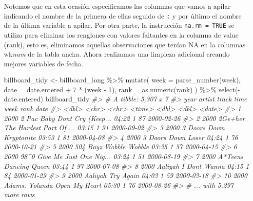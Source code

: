 \documentclass[
]{book}
\newenvironment{Shaded}{\begin{snugshade}}{\end{snugshade}}
\newcommand{\AttributeTok}[1]{\textcolor[rgb]{0.77,0.63,0.00}{#1}}
\newcommand{\CommentTok}[1]{\textcolor[rgb]{0.56,0.35,0.01}{\textit{#1}}}
\newcommand{\DecValTok}[1]{\textcolor[rgb]{0.00,0.00,0.81}{#1}}
\newcommand{\FunctionTok}[1]{\textcolor[rgb]{0.00,0.00,0.00}{#1}}
\newcommand{\NormalTok}[1]{#1}
\newcommand{\OtherTok}[1]{\textcolor[rgb]{0.56,0.35,0.01}{#1}}
\newcommand{\SpecialCharTok}[1]{\textcolor[rgb]{0.00,0.00,0.00}{#1}}
\begin{document}
Notemos que en esta ocasión especificamos las columnas que vamos a apilar
indicando el nombre de la primera de ellas seguido de \texttt{:} y por último el
nombre de la última variable a apilar. Por otra parte, la instrucción
\texttt{na.rm\ =\ TRUE} se utiliza para eliminar los renglones con valores faltantes en
la columna de value (rank), esto es, eliminamos aquellas observaciones que
tenían NA en la columnas wk\emph{num} de la tabla ancha. Ahora realizamos una
limpieza adicional creando mejores variables de fecha.

\begin{Shaded}
\begin{Highlighting}[]
\NormalTok{billboard\_tidy }\OtherTok{\textless{}{-}}\NormalTok{ billboard\_long }\SpecialCharTok{\%\textgreater{}\%}
  \FunctionTok{mutate}\NormalTok{(}
    \AttributeTok{week =} \FunctionTok{parse\_number}\NormalTok{(week),}
    \AttributeTok{date =}\NormalTok{ date.entered }\SpecialCharTok{+} \DecValTok{7} \SpecialCharTok{*}\NormalTok{ (week }\SpecialCharTok{{-}} \DecValTok{1}\NormalTok{), }
    \AttributeTok{rank =} \FunctionTok{as.numeric}\NormalTok{(rank)}
\NormalTok{    ) }\SpecialCharTok{\%\textgreater{}\%}
    \FunctionTok{select}\NormalTok{(}\SpecialCharTok{{-}}\NormalTok{date.entered)}
\NormalTok{billboard\_tidy}
\CommentTok{\#\textgreater{} \# A tibble: 5,307 x 7}
\CommentTok{\#\textgreater{}     year artist         track                   time    week  rank date      }
\CommentTok{\#\textgreater{}    \textless{}dbl\textgreater{} \textless{}chr\textgreater{}          \textless{}chr\textgreater{}                   \textless{}time\textgreater{} \textless{}dbl\textgreater{} \textless{}dbl\textgreater{} \textless{}date\textgreater{}    }
\CommentTok{\#\textgreater{}  1  2000 2 Pac          Baby Don\textquotesingle{}t Cry (Keep... 04:22      1    87 2000{-}02{-}26}
\CommentTok{\#\textgreater{}  2  2000 2Ge+her        The Hardest Part Of ... 03:15      1    91 2000{-}09{-}02}
\CommentTok{\#\textgreater{}  3  2000 3 Doors Down   Kryptonite              03:53      1    81 2000{-}04{-}08}
\CommentTok{\#\textgreater{}  4  2000 3 Doors Down   Loser                   04:24      1    76 2000{-}10{-}21}
\CommentTok{\#\textgreater{}  5  2000 504 Boyz       Wobble Wobble           03:35      1    57 2000{-}04{-}15}
\CommentTok{\#\textgreater{}  6  2000 98\^{}0           Give Me Just One Nig... 03:24      1    51 2000{-}08{-}19}
\CommentTok{\#\textgreater{}  7  2000 A*Teens        Dancing Queen           03:44      1    97 2000{-}07{-}08}
\CommentTok{\#\textgreater{}  8  2000 Aaliyah        I Don\textquotesingle{}t Wanna           04:15      1    84 2000{-}01{-}29}
\CommentTok{\#\textgreater{}  9  2000 Aaliyah        Try Again               04:03      1    59 2000{-}03{-}18}
\CommentTok{\#\textgreater{} 10  2000 Adams, Yolanda Open My Heart           05:30      1    76 2000{-}08{-}26}
\CommentTok{\#\textgreater{} \# ... with 5,297 more rows}
\end{Highlighting}
\end{Shaded}
\end{document}
